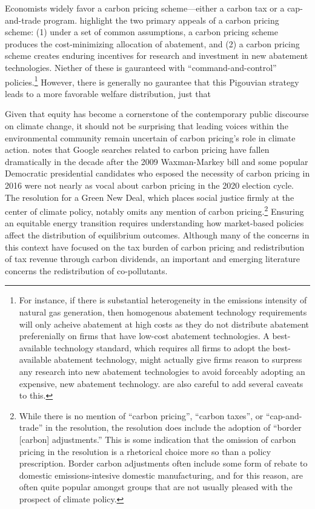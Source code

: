 \documentclass[11pt]{article}
\begin{document}
Economists widely favor a carbon pricing scheme---either a carbon tax or a cap-and-trade program. \cite{keohane2016markets} highlight the two primary appeals of a carbon pricing scheme: (1) under a set of common assumptions, a carbon pricing scheme produces the cost-minimizing allocation of abatement, and (2) a carbon pricing scheme creates enduring incentives for research and investment in new abatement technologies. Niether of these is gauranteed with ``command-and-control'' policies.\footnote{
	For instance, if there is substantial heterogeneity in the emissions intensity of natural gas generation, then homogenous abatement technology requirements will only acheive abatement at high costs as they do not distribute abatement preferenially on firms that have low-cost abatement technologies. A best-available technology standard, which requires all firms to adopt the best-available abatement technology, might actually give firms reason to surpress any research into new abatement technologies to avoid forceably adopting an expensive, new abatement technology.\cite{keohane2016markets} are also careful to add several caveats to this.
} However, there is generally no gaurantee that this Pigouvian strategy leads to a more favorable welfare distribution, just that 

Given that equity has become a cornerstone of the contemporary public discourse on climate change, it should not be surprising that leading voices within the environmental community remain uncertain of carbon pricing's role in climate action. \cite{fischer2021green} notes that Google searches related to carbon pricing have fallen dramatically in the decade after the 2009 Waxman-Markey bill and some popular Democratic presidential candidates who esposed the necessity of carbon pricing in 2016 were not nearly as vocal about carbon pricing in the 2020 election cycle. The resolution for a Green New Deal, which places social justice firmly at the center of climate policy, notably omits any mention of carbon pricing.\footnote{While there is no mention of ``carbon pricing'', ``carbon taxes'', or ``cap-and-trade'' in the resolution, the resolution does include the adoption of ``border [carbon] adjustments.'' This is some indication that the omission of carbon pricing in the resolution is a rhetorical choice more so than a policy prescription. Border carbon adjustments often include some form of rebate to domestic emissions-intesive domestic manufacturing, and for this reason, are often quite popular amongst groups that are not usually pleased with the prospect of climate policy.} Ensuring an equitable energy transition requires understanding how market-based policies affect the distribution of equilibrium outcomes. Although many of the concerns in this context have focused on the tax burden of carbon pricing and redistribution of tax revenue through carbon dividends, an important and emerging literature concerns the redistribution of co-pollutants.
\end{document}
